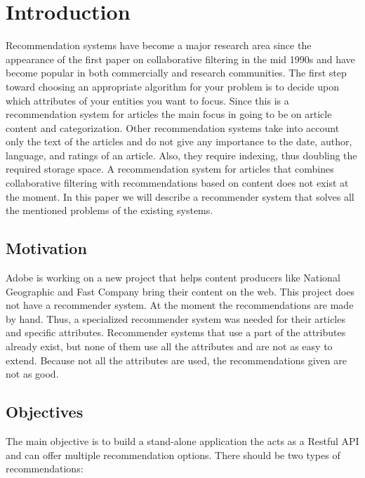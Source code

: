\chapter{Introduction}
\label{chapter:intro}

Recommendation systems have become a major research area since the appearance of the first paper on collaborative filtering in the mid 1990s and have become popular in both commercially and research communities. The first step toward choosing an appropriate algorithm for your problem is to decide upon which attributes of your entities you want to focus. Since this is a recommendation system for articles the main focus in going to be on article content and categorization. Other recommendation systems take into account only the text of the articles and do not give any importance to the date, author, language, and ratings of an article. Also, they require indexing, thus doubling the required storage space. A recommendation system for articles that combines collaborative filtering with recommendations based on content does not exist at the moment. In this paper we will describe a recommender system that solves all the mentioned problems of the existing systems.\\

\section{Motivation}
\label{sec:motivation}
Adobe is working on a new project that helps content producers like National Geographic and Fast Company bring their content on the web. This project does not have a recommender system. At the moment the recommendations are made by hand. Thus, a specialized recommender system was needed for their articles and specific attributes. Recommender systems that use a part of the attributes already exist, but none of them use all the attributes and are not as easy to extend. Because not all the attributes are used, the recommendations given are not as good.

\section{Objectives}
\label{sec:objectives}
The main objective is to build a stand-alone application the acts as a Restful API and can offer multiple recommendation options. There should be two types of recommendations:

